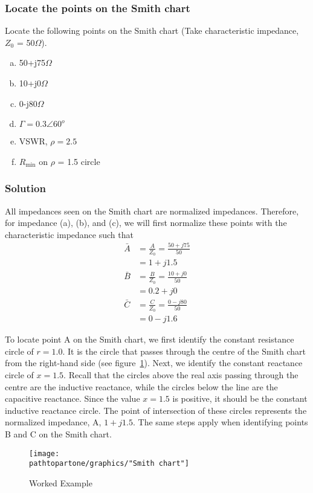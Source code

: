 \begin{exmp}\label{exmp:locatepoints}
\subsubsection*{Locate the points on the Smith chart}
Locate the following points on the Smith chart (Take characteristic impedance, $Z_{0}$ = 50$\Omega$).

\begin{enumerate}[(a)]
\item 50+j75$\varOmega$
\item 10+j0$\varOmega$
\item 0-j80$\varOmega$
\item $\Gamma=0.3\angle60^o$
\item VSWR, $\rho=2.5$
\item $R_\min$ on $\rho$ = 1.5 circle
\end{enumerate}

\subsubsection*{Solution}
All impedances seen on the Smith chart are normalized impedances. Therefore, for impedance (a), (b), and (c), we will first normalize these points with the characteristic impedance such that
\begin{align*}
\bar{A}&=\frac{A}{Z_{0}}
=\frac{50 + j75}{50}\\
&=1+j1.5\\
\bar{B}&=\frac{B}{Z_{0}}
= \frac{10 + j0}{50}\\
&=0.2+j0\\
\bar{C}&=\frac{C}{Z_{0}}
= \frac{0 - j80}{50}\\
&=0-j1.6
\end{align*}

To locate point A on the Smith chart, we first identify the constant resistance circle of $r = 1.0$. It is the circle that passes through the centre of the Smith chart from the right-hand side (see figure~\ref{fig:workedexample1}). Next, we identify the constant reactance circle of $x = 1.5$. Recall that the circles above the real axis passing through the centre are the inductive reactance, while the circles below the line are the capacitive reactance. Since the value $x = 1.5$ is positive, it should be the constant inductive reactance circle. The point of intersection of these circles represents the normalized impedance, A, $1 + j1.5$. The same steps apply when identifying points B and C on the Smith chart.
\begin{figure}[h]
\centering
\texttt{[image: \\pathtopartone/graphics/"Smith chart"]}
\caption{Worked Example}
\label{fig:workedexample1}
\end{figure}


\end{exmp}
